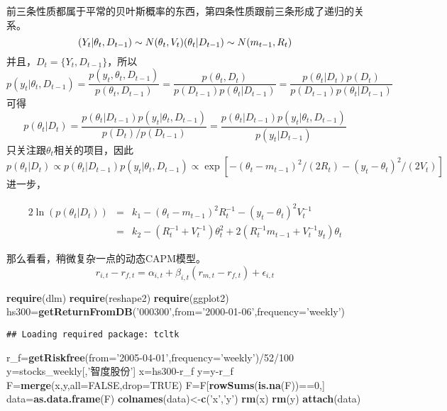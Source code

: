 \documentclass[]{ctexart}
\newenvironment{Shaded}{\begin{snugshade}}{\end{snugshade}}
\newcommand{\KeywordTok}[1]{\textcolor[rgb]{0.13,0.29,0.53}{\textbf{{#1}}}}
\newcommand{\DataTypeTok}[1]{\textcolor[rgb]{0.13,0.29,0.53}{{#1}}}
\newcommand{\DecValTok}[1]{\textcolor[rgb]{0.00,0.00,0.81}{{#1}}}
\newcommand{\StringTok}[1]{\textcolor[rgb]{0.31,0.60,0.02}{{#1}}}
\newcommand{\OtherTok}[1]{\textcolor[rgb]{0.56,0.35,0.01}{{#1}}}
\newcommand{\NormalTok}[1]{{#1}}
\begin{document}
前三条性质都属于平常的贝叶斯概率的东西，第四条性质跟前三条形成了递归的关系。
\[
(Y_t|\theta_t,D_{t-1})\sim N(\theta_t,V_t) \\
(\theta_t|D_{t-1})\sim N(m_{t-1},R_t)
\] 并且，\(D_t = \{ Y_t,D_{t-1}\}\)，所以 \[
p(y_t|\theta_t,D_{t-1})=\frac{p(y_t,\theta_t,D_{t-1})}{p(\theta_t,D_{t-1})}=\frac{p(\theta_t,D_{t})}{p(D_{t-1})p(\theta_t|D_{t-1})}=\frac{p(\theta_t|D_t)p(D_t)}{p(D_{t-1})p(\theta_t|D_{t-1})}
\] 可得 \[
p(\theta_t|D_t)=\frac{p(\theta_t|D_{t-1})p(y_t|\theta_t,D_{t-1})}{p(D_t)/p(D_{t-1})}=\frac{p(\theta_t|D_{t-1})p(y_t|\theta_t,D_{t-1})}{p(y_t|D_{t-1})}
\] 只关注跟\(\theta_t\)相关的项目，因此 \[
p(\theta_t|D_t)\propto p(\theta_t|D_{t-1})p(y_t|\theta_t,D_{t-1})\propto \exp[-(\theta_t-m_{t-1})^2/(2R_t) - (y_t-\theta_t)^2/(2V_t)]
\] 进一步，

\begin{eqnarray*}
2\ln(p(\theta_t|D_t))&=&k_1 -(\theta_t - m_{t-1})^2R_t^{-1}-(y_t-\theta_t)^2V_t^{-1} \\
                     &=&k_2 -(R_t^{-1}+V_t^{-1})\theta_t^2+2(R_t^{-1}m_{t-1}+V_t^{-1}y_t)\theta_t
\end{eqnarray*}

那么看看，稍微复杂一点的动态CAPM模型。 \[
  r_{i,t} - r_{f,t} = \alpha_{i,t} + \beta_{i,t} (r_{m,t}-r_{f,t})+\epsilon_{i,t}
\]

\begin{Shaded}
\begin{Highlighting}[]
\KeywordTok{require}\NormalTok{(dlm)}
\KeywordTok{require}\NormalTok{(reshape2)}
\KeywordTok{require}\NormalTok{(ggplot2)}
\NormalTok{hs300=}\KeywordTok{getReturnFromDB}\NormalTok{(}\StringTok{'000300'}\NormalTok{,}\DataTypeTok{from=}\StringTok{'2000-01-06'}\NormalTok{,}\DataTypeTok{frequency=}\StringTok{'weekly'}\NormalTok{)}
\end{Highlighting}
\end{Shaded}

\begin{verbatim}
## Loading required package: tcltk
\end{verbatim}

\begin{Shaded}
\begin{Highlighting}[]
\NormalTok{r_f=}\KeywordTok{getRiskfree}\NormalTok{(}\DataTypeTok{from=}\StringTok{'2005-04-01'}\NormalTok{,}\DataTypeTok{frequency=}\StringTok{'weekly'}\NormalTok{)/}\DecValTok{52}\NormalTok{/}\DecValTok{100}
\NormalTok{y=stocks_weekly[,}\StringTok{'智度股份'}\NormalTok{]}
\NormalTok{x=hs300-r_f}
\NormalTok{y=y-r_f}
\NormalTok{F=}\KeywordTok{merge}\NormalTok{(x,y,}\DataTypeTok{all=}\OtherTok{FALSE}\NormalTok{,}\DataTypeTok{drop=}\OtherTok{TRUE}\NormalTok{)}
\NormalTok{F=F[}\KeywordTok{rowSums}\NormalTok{(}\KeywordTok{is.na}\NormalTok{(F))==}\DecValTok{0}\NormalTok{,]}
\NormalTok{data=}\KeywordTok{as.data.frame}\NormalTok{(F)}
\KeywordTok{colnames}\NormalTok{(data)<-}\KeywordTok{c}\NormalTok{(}\StringTok{'x'}\NormalTok{,}\StringTok{'y'}\NormalTok{)}
\KeywordTok{rm}\NormalTok{(x)}
\KeywordTok{rm}\NormalTok{(y)}
\KeywordTok{attach}\NormalTok{(data)}
\end{Highlighting}
\end{Shaded}
\end{document}
